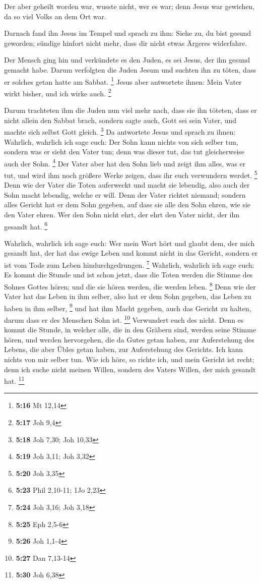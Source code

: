  Der aber geheilt worden war, wusste nicht, wer es war;
denn Jesus war gewichen, da so viel Volks an dem Ort war.

 Darnach fand ihn Jesus im Tempel und sprach zu ihm: Siehe
zu, du bist gesund geworden; sündige hinfort nicht mehr, dass dir nicht
etwas Ärgeres widerfahre.

 Der Mensch ging hin und verkündete es den Juden, es sei
Jesus, der ihn gesund gemacht habe.  Darum verfolgten die
Juden Jesum und suchten ihn zu töten, dass er solches getan hatte am
Sabbat. \footnote{\textbf{5:16} Mt 12,14}  Jesus aber
antwortete ihnen: Mein Vater wirkt bisher, und ich wirke auch.
\footnote{\textbf{5:17} Joh 9,4}

 Darum trachteten ihm die Juden nun viel mehr nach, dass
sie ihn töteten, dass er nicht allein den Sabbat brach, sondern sagte
auch, Gott sei sein Vater, und machte sich selbst Gott gleich.
\footnote{\textbf{5:18} Joh 7,30; Joh 10,33}  Da antwortete
Jesus und sprach zu ihnen: Wahrlich, wahrlich ich sage euch: Der Sohn
kann nichts von sich selber tun, sondern was er sieht den Vater tun;
denn was dieser tut, das tut gleicherweise auch der Sohn. \footnote{\textbf{5:19}
  Joh 3,11; Joh 3,32}  Der Vater aber hat den Sohn lieb und
zeigt ihm alles, was er tut, und wird ihm noch größere Werke zeigen,
dass ihr euch verwundern werdet. \footnote{\textbf{5:20} Joh 3,35}
 Denn wie der Vater die Toten auferweckt und macht sie
lebendig, also auch der Sohn macht lebendig, welche er will.
 Denn der Vater richtet niemand; sondern alles Gericht hat
er dem Sohn gegeben,  auf dass sie alle den Sohn ehren, wie
sie den Vater ehren. Wer den Sohn nicht ehrt, der ehrt den Vater nicht,
der ihn gesandt hat. \footnote{\textbf{5:23} Phil 2,10-11; 1Jo 2,23}

 Wahrlich, wahrlich ich sage euch: Wer mein Wort hört und
glaubt dem, der mich gesandt hat, der hat das ewige Leben und kommt
nicht in das Gericht, sondern er ist vom Tode zum Leben
hindurchgedrungen. \footnote{\textbf{5:24} Joh 3,16; Joh 3,18}
 Wahrlich, wahrlich ich sage euch: Es kommt die Stunde und
ist schon jetzt, dass die Toten werden die Stimme des Sohnes Gottes
hören; und die sie hören werden, die werden leben. \footnote{\textbf{5:25}
  Eph 2,5-6}  Denn wie der Vater hat das Leben in ihm
selber, also hat er dem Sohn gegeben, das Leben zu haben in ihm selber,
\footnote{\textbf{5:26} Joh 1,1-4}  und hat ihm Macht
gegeben, auch das Gericht zu halten, darum dass er des Menschen Sohn
ist. \footnote{\textbf{5:27} Dan 7,13-14}  Verwundert euch
des nicht. Denn es kommt die Stunde, in welcher alle, die in den Gräbern
sind, werden seine Stimme hören,  und werden hervorgehen,
die da Gutes getan haben, zur Auferstehung des Lebens, die aber Übles
getan haben, zur Auferstehung des Gerichts.  Ich kann
nichts von mir selber tun. Wie ich höre, so richte ich, und mein Gericht
ist recht; denn ich suche nicht meinen Willen, sondern des Vaters
Willen, der mich gesandt hat. \footnote{\textbf{5:30} Joh 6,38}

